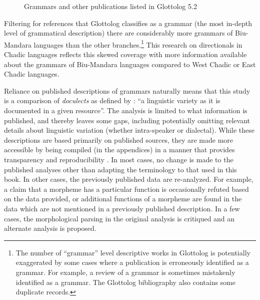 \testdata

\begin{figure}
	\caption{Grammars and other publications listed in Glottolog 5.2} \label{fig:grammars}
\end{figure}

Filtering for references that Glottolog classifies as a grammar (the most in-depth level of grammatical description) there are considerably more grammars of Biu-Mandara languages than the other branches.\footnote{The number of ``grammar'' level descriptive works in Glottolog is potentially exaggerated by some cases where a publication is erroneously identified as a grammar. For example, a review of a grammar is sometimes mistakenly identified as a grammar. The Glottolog bibliography also contains some duplicate records.} This research on directionals in Chadic languages reflects this skewed coverage with more information available about the grammars of Biu-Mandara languages compared to West Chadic or East Chadic languages.

Reliance on published descriptions of grammars naturally means that this study is a comparison of \textit{doculects} as defined by \citet[342]{goodLanguoidDoculectGlossonym2013}: ``a linguistic variety as it is documented in a given resource''. The analysis is limited to what information is published, and thereby leaves some gaps, including potentially omitting relevant details about linguistic variation (whether intra-speaker or dialectal). While these descriptions are based primarily on published sources, they are made more accessible by being compiled (in the appendices) in a manner that provides transparency and reproducibility \citep{berez-kroekerReproducibleResearchLinguistics2018}. In most cases, no change is made to the published analyses other than adapting the terminology to that used in this book. In other cases, the previously published data are re-analyzed. For example, a claim that a morpheme has a particular function is occasionally refuted based on the data provided, or additional functions of a morpheme are found in the data which are not mentioned in a previously published description. In a few cases, the morphological parsing in the original analysis is critiqued and an alternate analysis is proposed.

